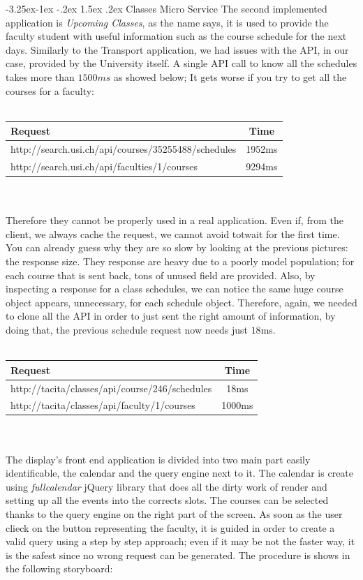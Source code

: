 \documentclass[]{usiinfbachelorproject}
\makeatletter
\newcommand\subsubsection{\@startsection{subsubsection}{3}{\z@}%
                {-3.25ex\@plus -1ex \@minus -.2ex}%
                {1.5ex \@plus .2ex}%
                {\normalfont\normalsize\bfseries}}
\makeatother
\begin{document}
\subsubsection{Classes Micro Service}
The second implemented application is \emph{Upcoming Classes}, as the name says, it is used to provide the faculty student with useful information such as the course schedule for the next days. Similarly to the Transport application, we had issues with the API, in our case, provided by the University itself.
A single API call to know all the schedules takes more than $1500ms$ as showed below;
It gets worse if you try to get all the courses for a faculty:
\\
\\
\begin{tabular}{ l | c }
	Request & Time \\
	\hline
	http://search.usi.ch/api/courses/35255488/schedules & 1952ms \\
	http://search.usi.ch/api/faculties/1/courses & 9294ms\\
\end{tabular}
\\
\\
Therefore they cannot be properly used in a real application. Even if, from the client, we always cache the request, we cannot avoid totwait for the first time. You can already guess why they are so slow by looking at the previous pictures: the response size. They response are heavy due to a poorly model population; for each course that is sent back, tons of unused field are provided. Also, by inspecting a response for a class schedules, we can notice the same huge course object appears, unnecessary, for each schedule object.
Therefore, again, we needed to clone all the API in order to just sent the right amount of information, by doing that, the previous schedule request now needs just $18$ms.
\\
\\
\begin{tabular}{ l | c }
	Request & Time \\
	\hline
	 http://tacita/classes/api/course/246/schedules & 18ms \\
	 http://tacita/classes/api/faculty/1/courses & 1000ms\\
\end{tabular}
\\
\\
The display's front end application is divided into two main part easily identificable, the calendar and the query engine next to it. The calendar is create using \emph{fullcalendar} jQuery library that does all the dirty work of render and setting up all the events into the corrects slots. 
The courses can be selected thanks to the query engine on the right part of the screen. As soon as the user clieck on the button representing the faculty, it is guided in order to create a valid query using a step by step approach; even if it may be not the faster way, it is the safest since no wrong request can be generated. The procedure is shows in the following storyboard:
\end{document}
